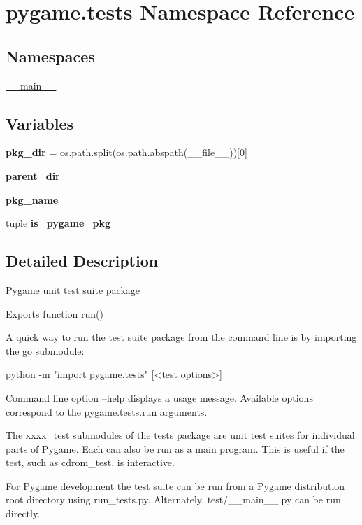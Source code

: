 \hypertarget{namespacepygame_1_1tests}{}\section{pygame.\+tests Namespace Reference}
\label{namespacepygame_1_1tests}
\subsection*{Namespaces}
\begin{DoxyCompactItemize}
\item 
 \hyperlink{namespacepygame_1_1tests_1_1____main____}{\+\_\+\+\_\+main\+\_\+\+\_\+}
\end{DoxyCompactItemize}
\subsection*{Variables}
\begin{DoxyCompactItemize}
\item 
\mbox{\label{namespacepygame_1_1tests_adcaa7d58b42f4898d1e097d857720745}} 
{\bfseries pkg\+\_\+dir} = os.\+path.\+split(os.\+path.\+abspath(\+\_\+\+\_\+file\+\_\+\+\_\+))\mbox{[}0\mbox{]}
\item 
\mbox{\label{namespacepygame_1_1tests_a47e8705787a06f4b6ac14201cc98c120}} 
{\bfseries parent\+\_\+dir}
\item 
\mbox{\label{namespacepygame_1_1tests_aa2d5abfa1d0340e216cb025575c8f39b}} 
{\bfseries pkg\+\_\+name}
\item 
tuple {\bfseries is\+\_\+pygame\+\_\+pkg}
\end{DoxyCompactItemize}


\subsection{Detailed Description}
\begin{DoxyVerb}Pygame unit test suite package

Exports function run()

A quick way to run the test suite package from the command line
is by importing the go submodule:

python -m "import pygame.tests" [<test options>]

Command line option --help displays a usage message. Available options
correspond to the pygame.tests.run arguments.

The xxxx_test submodules of the tests package are unit test suites for
individual parts of Pygame. Each can also be run as a main program. This is
useful if the test, such as cdrom_test, is interactive.

For Pygame development the test suite can be run from a Pygame distribution
root directory using run_tests.py. Alternately, test/__main__.py can be run
directly.\end{DoxyVerb}
 

